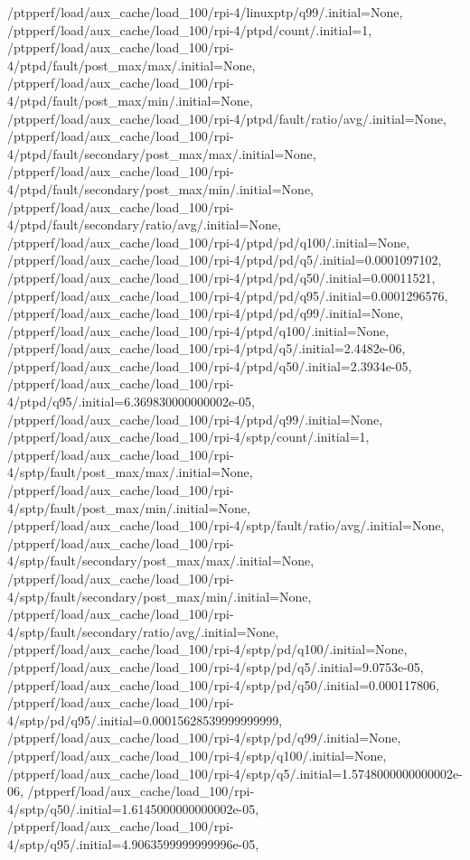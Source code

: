 {    /ptpperf/load/aux_cache/load_100/rpi-4/linuxptp/q99/.initial=None,
    /ptpperf/load/aux_cache/load_100/rpi-4/ptpd/count/.initial=1,
    /ptpperf/load/aux_cache/load_100/rpi-4/ptpd/fault/post_max/max/.initial=None,
    /ptpperf/load/aux_cache/load_100/rpi-4/ptpd/fault/post_max/min/.initial=None,
    /ptpperf/load/aux_cache/load_100/rpi-4/ptpd/fault/ratio/avg/.initial=None,
    /ptpperf/load/aux_cache/load_100/rpi-4/ptpd/fault/secondary/post_max/max/.initial=None,
    /ptpperf/load/aux_cache/load_100/rpi-4/ptpd/fault/secondary/post_max/min/.initial=None,
    /ptpperf/load/aux_cache/load_100/rpi-4/ptpd/fault/secondary/ratio/avg/.initial=None,
    /ptpperf/load/aux_cache/load_100/rpi-4/ptpd/pd/q100/.initial=None,
    /ptpperf/load/aux_cache/load_100/rpi-4/ptpd/pd/q5/.initial=0.0001097102,
    /ptpperf/load/aux_cache/load_100/rpi-4/ptpd/pd/q50/.initial=0.00011521,
    /ptpperf/load/aux_cache/load_100/rpi-4/ptpd/pd/q95/.initial=0.0001296576,
    /ptpperf/load/aux_cache/load_100/rpi-4/ptpd/pd/q99/.initial=None,
    /ptpperf/load/aux_cache/load_100/rpi-4/ptpd/q100/.initial=None,
    /ptpperf/load/aux_cache/load_100/rpi-4/ptpd/q5/.initial=2.4482e-06,
    /ptpperf/load/aux_cache/load_100/rpi-4/ptpd/q50/.initial=2.3934e-05,
    /ptpperf/load/aux_cache/load_100/rpi-4/ptpd/q95/.initial=6.369830000000002e-05,
    /ptpperf/load/aux_cache/load_100/rpi-4/ptpd/q99/.initial=None,
    /ptpperf/load/aux_cache/load_100/rpi-4/sptp/count/.initial=1,
    /ptpperf/load/aux_cache/load_100/rpi-4/sptp/fault/post_max/max/.initial=None,
    /ptpperf/load/aux_cache/load_100/rpi-4/sptp/fault/post_max/min/.initial=None,
    /ptpperf/load/aux_cache/load_100/rpi-4/sptp/fault/ratio/avg/.initial=None,
    /ptpperf/load/aux_cache/load_100/rpi-4/sptp/fault/secondary/post_max/max/.initial=None,
    /ptpperf/load/aux_cache/load_100/rpi-4/sptp/fault/secondary/post_max/min/.initial=None,
    /ptpperf/load/aux_cache/load_100/rpi-4/sptp/fault/secondary/ratio/avg/.initial=None,
    /ptpperf/load/aux_cache/load_100/rpi-4/sptp/pd/q100/.initial=None,
    /ptpperf/load/aux_cache/load_100/rpi-4/sptp/pd/q5/.initial=9.0753e-05,
    /ptpperf/load/aux_cache/load_100/rpi-4/sptp/pd/q50/.initial=0.000117806,
    /ptpperf/load/aux_cache/load_100/rpi-4/sptp/pd/q95/.initial=0.00015628539999999999,
    /ptpperf/load/aux_cache/load_100/rpi-4/sptp/pd/q99/.initial=None,
    /ptpperf/load/aux_cache/load_100/rpi-4/sptp/q100/.initial=None,
    /ptpperf/load/aux_cache/load_100/rpi-4/sptp/q5/.initial=1.5748000000000002e-06,
    /ptpperf/load/aux_cache/load_100/rpi-4/sptp/q50/.initial=1.6145000000000002e-05,
    /ptpperf/load/aux_cache/load_100/rpi-4/sptp/q95/.initial=4.9063599999999996e-05,
}
